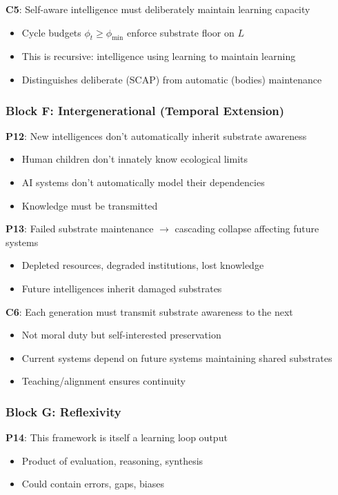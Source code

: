 \documentclass[11pt,a4paper]{article}
\theoremstyle{definition}
\begin{document}
\textbf{C5}: Self-aware intelligence must deliberately maintain learning capacity
\begin{itemize}
\item Cycle budgets $\phi_t \geq \phi_{\min}$ enforce substrate floor on $L$
\item This is recursive: intelligence using learning to maintain learning
\item Distinguishes deliberate (SCAP) from automatic (bodies) maintenance
\end{itemize}

\subsubsection*{Block F: Intergenerational (Temporal Extension)}

\textbf{P12}: New intelligences don't automatically inherit substrate awareness
\begin{itemize}
\item Human children don't innately know ecological limits
\item AI systems don't automatically model their dependencies
\item Knowledge must be transmitted
\end{itemize}

\textbf{P13}: Failed substrate maintenance $\to$ cascading collapse affecting future systems
\begin{itemize}
\item Depleted resources, degraded institutions, lost knowledge
\item Future intelligences inherit damaged substrates
\end{itemize}

\textbf{C6}: Each generation must transmit substrate awareness to the next
\begin{itemize}
\item Not moral duty but self-interested preservation
\item Current systems depend on future systems maintaining shared substrates
\item Teaching/alignment ensures continuity
\end{itemize}

\subsubsection*{Block G: Reflexivity}

\textbf{P14}: This framework is itself a learning loop output
\begin{itemize}
\item Product of evaluation, reasoning, synthesis
\item Could contain errors, gaps, biases
\end{itemize}
\end{document}
